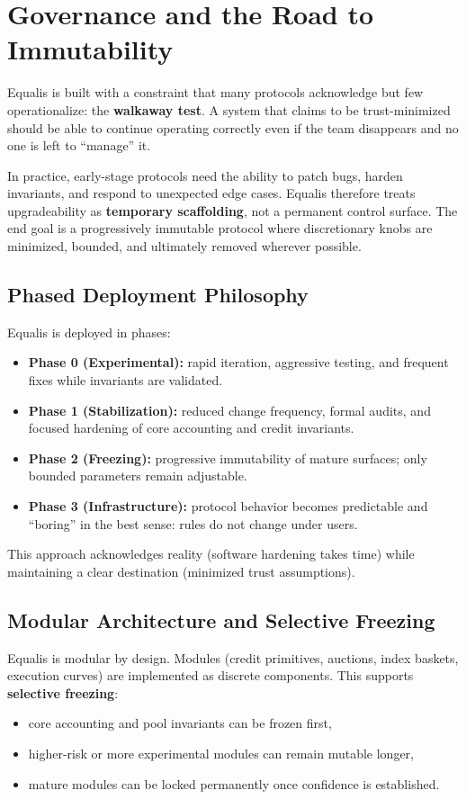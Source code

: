 \documentclass[version=preprint]{iacrcc}
\begin{document}
\section{Governance and the Road to Immutability}

Equalis is built with a constraint that many protocols acknowledge but few operationalize: the \textbf{walkaway test}. A system that claims to be trust-minimized should be able to continue operating correctly even if the team disappears and no one is left to ``manage'' it.

In practice, early-stage protocols need the ability to patch bugs, harden invariants, and respond to unexpected edge cases. Equalis therefore treats upgradeability as \textbf{temporary scaffolding}, not a permanent control surface. The end goal is a progressively immutable protocol where discretionary knobs are minimized, bounded, and ultimately removed wherever possible.

\subsection{Phased Deployment Philosophy}

Equalis is deployed in phases:
\begin{itemize}
  \item \textbf{Phase 0 (Experimental):} rapid iteration, aggressive testing, and frequent fixes while invariants are validated.
  \item \textbf{Phase 1 (Stabilization):} reduced change frequency, formal audits, and focused hardening of core accounting and credit invariants.
  \item \textbf{Phase 2 (Freezing):} progressive immutability of mature surfaces; only bounded parameters remain adjustable.
  \item \textbf{Phase 3 (Infrastructure):} protocol behavior becomes predictable and ``boring'' in the best sense: rules do not change under users.
\end{itemize}

This approach acknowledges reality (software hardening takes time) while maintaining a clear destination (minimized trust assumptions).

\subsection{Modular Architecture and Selective Freezing}

Equalis is modular by design. Modules (credit primitives, auctions, index baskets, execution curves) are implemented as discrete components. This supports \textbf{selective freezing}:
\begin{itemize}
  \item core accounting and pool invariants can be frozen first,
  \item higher-risk or more experimental modules can remain mutable longer,
  \item mature modules can be locked permanently once confidence is established.
\end{itemize}
\end{document}
